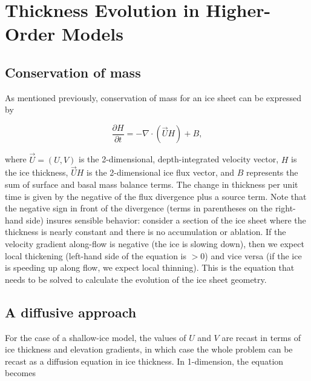 
\section{Thickness Evolution in Higher-Order Models}
\label{sc:ho-thickness-evol}

\subsection{Conservation of mass}
As mentioned previously, conservation of mass for an ice sheet can be expressed by

\begin{equation}
\frac{\partial H}{\partial t}=-\nabla \cdot \left( \vec{U}H \right)+B,
\end{equation}

where $\vec{U}=(U,V)$ is the 2-dimensional, depth-integrated velocity vector, $H$ is the ice thickness, $\vec{U}H$ is the 2-dimensional ice flux vector, and $B$ represents the sum of surface and basal mass balance terms. The change in thickness per unit time is given by the negative of the flux divergence plus a source term. 
%
%
Note that the negative sign in front of the divergence (terms in parentheses on the right-hand side) insures sensible behavior: consider a section of the ice sheet where the thickness is nearly constant and there is no accumulation or ablation. If the velocity gradient along-flow is negative (the ice is slowing down), then we expect local thickening (left-hand side of the equation is $>0$) and vice versa (if the ice is speeding up along flow, we expect local thinning). This is the equation that needs to be solved to calculate the evolution of the ice sheet geometry.

\subsection{A diffusive approach}
For the case of a shallow-ice model, the values of $U$ and $V$ are recast in terms of ice thickness and elevation gradients, in which case the whole problem can be recast as a diffusion equation in ice thickness. In 1-dimension, the equation becomes

